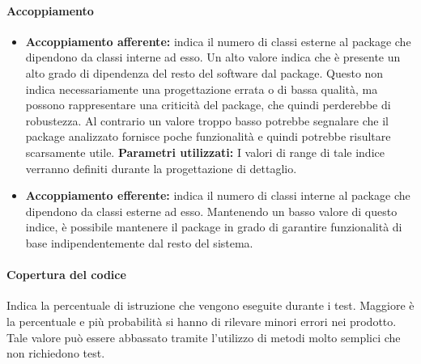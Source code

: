 \paragraph{Accoppiamento}
\begin{itemize}
\item \textbf{Accoppiamento afferente:} indica il numero di classi esterne al package che dipendono da classi interne ad esso. Un alto valore indica che è presente un alto grado di dipendenza del resto del software dal package. Questo non indica necessariamente una progettazione errata o di bassa qualità, ma possono rappresentare una criticità del package, che quindi perderebbe di robustezza. Al contrario un valore troppo basso potrebbe segnalare che il package analizzato fornisce poche funzionalità e quindi potrebbe risultare scarsamente utile.
\textbf{Parametri utilizzati:}
I valori di range di tale indice verranno definiti durante la progettazione di dettaglio.
\item \textbf{Accoppiamento efferente:} indica il numero di classi interne al package che dipendono da classi esterne ad esso. Mantenendo un basso valore di questo indice, è possibile mantenere il package in grado di garantire funzionalità di base indipendentemente dal resto del sistema.
\end{itemize}
\paragraph{Copertura del codice}
Indica la percentuale di istruzione che vengono eseguite durante i test. Maggiore è la percentuale e più probabilità si hanno di rilevare minori errori nei prodotto. Tale valore può essere abbassato tramite l'utilizzo di metodi molto semplici che non richiedono test.\\